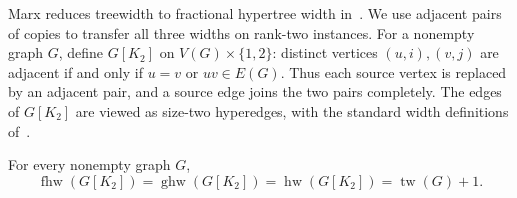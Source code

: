 Marx reduces treewidth to fractional hypertree width
in~\cite[proof of Theorem~5.1]{Marx2010Fractional}. We use adjacent
pairs of copies to transfer all three widths on rank-two instances.
For a nonempty graph $G$, define $G[K_2]$ on
$V(G)\times\{1,2\}$: distinct vertices $(u,i),(v,j)$ are adjacent
if and only if $u=v$ or $uv\in E(G)$. Thus each source vertex is
replaced by an adjacent pair, and a source edge joins the two pairs
completely.
The edges of $G[K_2]$ are viewed as size-two hyperedges, with the
standard width definitions of~\cite{GottlobEtAlHypertree}.
\begin{lemma}
\label{lem:rank-two-width}
For every nonempty graph $G$,
\[
 \operatorname{fhw}(G[K_2])=\operatorname{ghw}(G[K_2])
 =\operatorname{hw}(G[K_2])=\operatorname{tw}(G)+1.
\]
\end{lemma}
